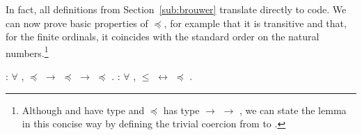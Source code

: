 In fact, all definitions from Section~\ref{sub:brouwer} translate directly to
\Coq code. We can now prove basic properties of $\preceq$, for example
that it is transitive and that, for the finite ordinals, it coincides
with the standard order on the natural numbers.\footnote{Although
   and  have type
  and $\preceq$ has type 
  $\rightarrow$ 
  $\rightarrow$ , we can state the lemma in this
  concise way by defining the trivial coercion from
  to .}
\begin{singlespace}
\begin{coqdoccode}
\coqdocnoindent
{}
:
\ensuremath{\forall} \coqdocvar{\ensuremath{\alpha}}
\coqdocvar{\ensuremath{\beta}}
\coqdocvar{\ensuremath{\gamma}}, \coqdocvariable{\ensuremath{\alpha}}
\ensuremath{\preceq} \coqdocvariable{\ensuremath{\beta}}
\ensuremath{\rightarrow}
\coqdocvariable{\ensuremath{\beta}} \ensuremath{\preceq}
\coqdocvariable{\ensuremath{\gamma}}
\ensuremath{\rightarrow} \coqdocvariable{\ensuremath{\alpha}}
\ensuremath{\preceq}
\coqdocvariable{\ensuremath{\gamma}}.\coqdoceol
\coqdocemptyline
\coqdocnoindent
{}
 :
\ensuremath{\forall}  , 
\ensuremath{\le}  \ensuremath{\leftrightarrow}
 \ensuremath{\preceq} .\coqdoceol
\end{coqdoccode}
\end{singlespace}

